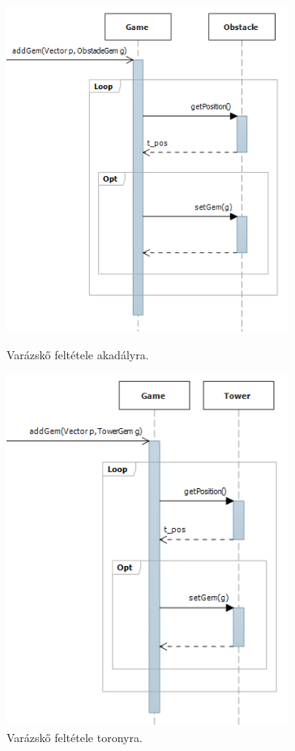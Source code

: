 \begin{figure}[H]
\begin{center}
\includegraphics[width=92mm]{images/ch04/add_gem_obstacle.png}
\caption{Varázskő feltétele akadályra.}
\label{fig:adding_gem}

\includegraphics[width=92mm]{images/ch04/add_gem_tower.png}
\caption{Varázskő feltétele toronyra.}
\label{fig:adding_gem}
\end{center}
\end{figure}

